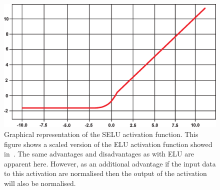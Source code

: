             \begin{figure}
                \centering
                
                \includegraphics[width=1.0\linewidth]{figures/background_selu.png}
                
                \captionsetup{singlelinecheck=false}
                \caption{
                    Graphical representation of the \gls{SELU} activation function. This figure shows a scaled version of the \gls{ELU} activation function showed in~. The same advantages and disadvantages as with \gls{ELU} are apparent here. However, as an additional advantage if the input data to this activation are normalised then the output of the activation will also be normalised.
                }
                \label{fig:pseudo_bayesian_dip_denoising_as_a_preprocessing_step_for_kinetic_modelling_in_dynamic_pet_appendix_methods_network_design_and_execution_selu}
            \end{figure}

